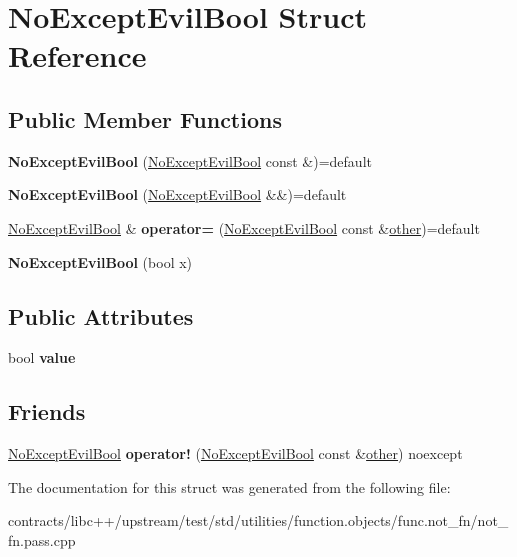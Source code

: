 \hypertarget{struct_no_except_evil_bool}{}\section{No\+Except\+Evil\+Bool Struct Reference}
\label{struct_no_except_evil_bool}
\subsection*{Public Member Functions}
\begin{DoxyCompactItemize}
\item 
\mbox{\label{struct_no_except_evil_bool_a6552b410a793ca20eb4fce140ffced80}} 
{\bfseries No\+Except\+Evil\+Bool} (\mbox{\hyperlink{struct_no_except_evil_bool}{No\+Except\+Evil\+Bool}} const \&)=default
\item 
\mbox{\label{struct_no_except_evil_bool_aeffa4a65484bc93a159f3ab9bf13593e}} 
{\bfseries No\+Except\+Evil\+Bool} (\mbox{\hyperlink{struct_no_except_evil_bool}{No\+Except\+Evil\+Bool}} \&\&)=default
\item 
\mbox{\label{struct_no_except_evil_bool_a5525b4470d191a8c4730e400d6264e82}} 
\mbox{\hyperlink{struct_no_except_evil_bool}{No\+Except\+Evil\+Bool}} \& {\bfseries operator=} (\mbox{\hyperlink{struct_no_except_evil_bool}{No\+Except\+Evil\+Bool}} const \&\mbox{\hyperlink{structother}{other}})=default
\item 
\mbox{\label{struct_no_except_evil_bool_a520f1a8a9dbe6661034e4097a9041abd}} 
{\bfseries No\+Except\+Evil\+Bool} (bool x)
\end{DoxyCompactItemize}
\subsection*{Public Attributes}
\begin{DoxyCompactItemize}
\item 
\mbox{\label{struct_no_except_evil_bool_ad9578718115c95d60832c1c1f5d7a79f}} 
bool {\bfseries value}
\end{DoxyCompactItemize}
\subsection*{Friends}
\begin{DoxyCompactItemize}
\item 
\mbox{\label{struct_no_except_evil_bool_a427a6a981bcbbde7cde9159640aa6df5}} 
\mbox{\hyperlink{struct_no_except_evil_bool}{No\+Except\+Evil\+Bool}} {\bfseries operator!} (\mbox{\hyperlink{struct_no_except_evil_bool}{No\+Except\+Evil\+Bool}} const \&\mbox{\hyperlink{structother}{other}}) noexcept
\end{DoxyCompactItemize}


The documentation for this struct was generated from the following file\+:\begin{DoxyCompactItemize}
\item 
contracts/libc++/upstream/test/std/utilities/function.\+objects/func.\+not\+\_\+fn/not\+\_\+fn.\+pass.\+cpp\end{DoxyCompactItemize}
